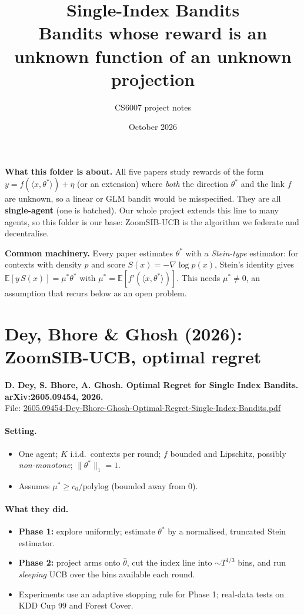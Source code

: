 \documentclass[11pt]{article}
\title{Single-Index Bandits\\[2pt]\large Bandits whose reward is an unknown function of an unknown projection}
\author{CS6007 project notes}
\date{October 2026}
\newcommand{\file}[1]{\url{#1}}
\begin{document}
\maketitle
\textbf{What this folder is about.} All five papers study rewards of the form
$y=f(\langle x,\theta^*\rangle)+\eta$ (or an extension) where \emph{both} the direction $\theta^*$ and
the link $f$ are unknown, so a linear or GLM bandit would be misspecified. They are all
\textbf{single-agent} (one is batched). Our whole project extends this line to many agents, so
this folder is our base: ZoomSIB-UCB is the algorithm we federate and decentralise.

\textbf{Common machinery.} Every paper estimates $\theta^*$ with a \emph{Stein-type} estimator: for
contexts with density $p$ and score $S(x)=-\nabla\log p(x)$, Stein's identity gives
$\mathbb{E}[y\,S(x)]=\mu^*\theta^*$ with $\mu^*=\mathbb{E}[f'(\langle x,\theta^*\rangle)]$. This needs
$\mu^*\neq 0$, an assumption that recurs below as an open problem.
\tableofcontents
\bigskip
\section{Dey, Bhore \& Ghosh (2026): ZoomSIB-UCB, optimal regret}
\textbf{D. Dey, S. Bhore, A. Ghosh. Optimal Regret for Single Index Bandits. arXiv:2605.09454, 2026.}\\ File: \file{2605.09454-Dey-Bhore-Ghosh-Optimal-Regret-Single-Index-Bandits.pdf}
\paragraph{Setting.}
\begin{itemize}\item One agent; $K$ i.i.d.\ contexts per round; $f$ bounded and Lipschitz, possibly \emph{non-monotone}; $\|\theta^*\|_1=1$.\item Assumes $\mu^*\ge c_0/\mathrm{polylog}$ (bounded away from 0).\end{itemize}
\paragraph{What they did.}
\begin{itemize}\item \textbf{Phase 1:} explore uniformly; estimate $\theta^*$ by a normalised, truncated Stein estimator.\item \textbf{Phase 2:} project arms onto $\hat\theta$, cut the index line into $\sim T^{1/3}$ bins, and run \emph{sleeping} UCB over the bins available each round.\item Experiments use an adaptive stopping rule for Phase 1; real-data tests on KDD Cup 99 and Forest Cover.\end{itemize}
\end{document}
